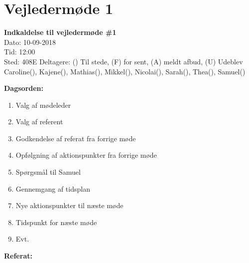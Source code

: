 \section{Vejledermøde 1}
\vspace{0.5 cm}
\textbf{Indkaldelse til vejledermøde \#1} \\

Dato: 10-09-2018 \\
Tid: 12:00 \\
Sted: 408E
Deltagere: () Til stede, (F) for sent, (A) meldt afbud, (U) Udeblev \\
Caroline(), Kajene(), Mathias(), Mikkel(), Nicolai(), Sarah(), Thea(), Samuel() 

\vspace{0.1 cm}
\textbf{Dagsorden:}

\begin{enumerate}
	\item Valg af mødeleder
	\item Valg af referent
	\item Godkendelse af referat fra forrige møde
	\item Opfølgning af aktionspunkter fra forrige møde
	\item Spørgsmål til Samuel
	\item Gennemgang af tidsplan
	\item Nye aktionspunkter til næste møde
	\item Tidspunkt for næste møde
	\item Evt.
\end{enumerate}

\textbf{Referat:}

